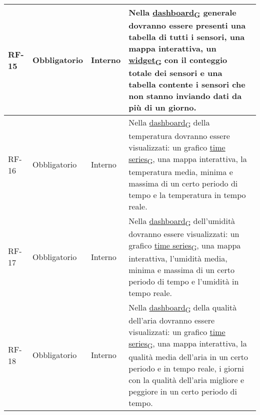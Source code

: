 \begin{longtable}{|>{\centering\arraybackslash}m{}|>{\centering\arraybackslash}m{}|>{\centering\arraybackslash}m{}|>{\centering\arraybackslash}m{}|}
	RF-15           & Obbligatorio        & Interno                                                                                                           & Nella \href{https://7last.github.io/docs/rtb/documentazione-interna/glossario\#dashboard}{dashboard\textsubscript{G}} generale dovranno essere presenti una tabella di tutti i sensori, una mappa interattiva, un \href{https://7last.github.io/docs/rtb/documentazione-interna/glossario\#widget}{widget\textsubscript{G}} con il conteggio totale dei sensori e una tabella contente i sensori che non stanno inviando dati da più di un giorno.                                                   \\\hline
	RF-16           & Obbligatorio        & Interno                                                                                                           & Nella \href{https://7last.github.io/docs/rtb/documentazione-interna/glossario\#dashboard}{dashboard\textsubscript{G}} della temperatura dovranno essere visualizzati: un grafico \href{https://7last.github.io/docs/rtb/documentazione-interna/glossario\#time-series}{time series\textsubscript{G}}, una mappa interattiva, la temperatura media, minima e massima di un certo periodo di tempo e la temperatura in tempo reale.                                                                    \\\hline
	RF-17           & Obbligatorio        & Interno                                                                                                           & Nella \href{https://7last.github.io/docs/rtb/documentazione-interna/glossario\#dashboard}{dashboard\textsubscript{G}} dell'umidità dovranno essere visualizzati: un grafico \href{https://7last.github.io/docs/rtb/documentazione-interna/glossario\#time-series}{time series\textsubscript{G}}, una mappa interattiva, l'umidità media, minima e massima di un certo periodo di tempo e l'umidità in tempo reale.                                                                                   \\\hline
	RF-18           & Obbligatorio        & Interno                                                                                                           & Nella \href{https://7last.github.io/docs/rtb/documentazione-interna/glossario\#dashboard}{dashboard\textsubscript{G}} della qualità dell'aria dovranno essere visualizzati: un grafico \href{https://7last.github.io/docs/rtb/documentazione-interna/glossario\#time-series}{time series\textsubscript{G}}, una mappa interattiva, la qualità media dell'aria in un certo periodo e in tempo reale, i giorni con la qualità dell'aria migliore e peggiore in un certo periodo di tempo.              \\\hline

\end{longtable}
